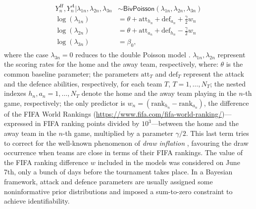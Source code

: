 \documentclass{statsoc}
\begin{document}
\begin{eqnarray}
\begin{split}
Y^H_n, Y^A_n| \lambda_{1n}, \lambda_{2n}, \lambda_{3n} & \sim \mathsf{BivPoisson}(\lambda_{1n}, \lambda_{2n}, \lambda_{3n})\\ 
\log(\lambda_{1n}) & = \theta+\text{att}_{h_n}+\text{def}_{a_n}+\frac{\gamma}{2} w_n\\
\log(\lambda_{2n}) & = \theta+\text{att}_{a_n}+\text{def}_{h_n}-\frac{\gamma}{2} w_n\\
\log(\lambda_{3n}) & =\beta_0,
\end{split}
\label{eq:bivariate}
\end{eqnarray}
where the case $\lambda_{3n}=0$ reduces to the double Poisson model \citep{baio2010bayesian}.  $\lambda_{1n}, \lambda_{2n}$ represent the scoring rates for the home and the away team, respectively, where: $\theta$ is the common baseline parameter; the parameters $\text{att}_T$ and $\text{def}_T$ represent the attack and the defence abilities, 
respectively, for each team $T$, $T=1,\ldots,N_T$; the nested indexes $h_{n}, a_{n}=1,\ldots,N_T$ denote the home and the away team playing in the $n$-th game, 
respectively; the only predictor is $w_n= (\text{rank}_{h_n}- \text{rank}_{a_n} )$, the difference of the FIFA World Rankings (\url{https://www.fifa.com/fifa-world-ranking/})---expressed in FIFA ranking points divided by $10^3$---between the home and the away team in 
the $n$-th game, multiplied by a parameter ${\gamma}/{2}$.  This last term tries to correct for the well-known phenomenon of \emph{draw inflation} \citep{karlis2003analysis}, 
favouring the draw occurrence when teams are close in terms of their FIFA rankings. The value of the 
FIFA ranking difference $w$ included in the models was considered on June 7th, only a bunch 
of days before the tournament takes place.  In a Bayesian framework, attack and defence parameters are usually assigned some noninformative prior distributions \citep{baio2010bayesian} and imposed a sum-to-zero constraint to achieve identifiability.

 
\end{document}
